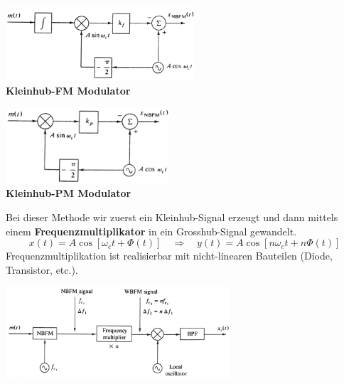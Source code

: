 \begin{minipage}[t][3cm][c]{9cm}	
	\begin{center}
  		\includegraphics[height=2.8cm]{bilder/fm_nbfm_modulator.png} \\
  		\textbf{Kleinhub-FM Modulator}
	\end{center}
\end{minipage}
\begin{minipage}[t][3cm][c]{9cm} 
	\begin{center}
		\includegraphics[height=2.8cm]{bilder/fm_nbpm_modulator.png} \\ 
  		\textbf{Kleinhub-PM Modulator}
	\end{center}
\end{minipage}

\begin{minipage}[t][3cm][c]{10cm}	
	Bei dieser Methode wir zuerst ein Kleinhub-Signal erzeugt und dann mittels einem
	\textbf{Frequenzmultiplikator} in ein Grosshub-Signal gewandelt.
	$$ x(t) = A \cos[\omega_c t + \Phi(t)] \quad \Rightarrow \quad y(t) = A \cos[n \omega _c t + n
	\Phi(t)]$$ Frequenzmultiplikation ist realisierbar mit nicht-linearen Bauteilen (Diode, Transistor,
	etc.).
\end{minipage}
\begin{minipage}[t][3cm][c]{8.5cm} 
	\begin{center}
		\includegraphics[height=3.4cm]{bilder/fm_nbfm2wbfmConverter.png}
	\end{center}
\end{minipage}

